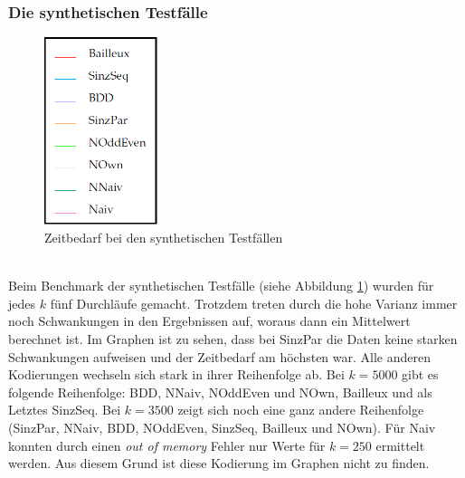 \documentclass[a4,abstract=on]{scrartcl}
\begin{document}
\subsubsection*{Die synthetischen Testfälle}


\begin{figure}[htbp]
\includegraphics[width=3.3cm]{legende.png}
\caption{Zeitbedarf bei den synthetischen Testfällen}
\label{fig:synth}
\end{figure}
\ \\
Beim Benchmark der synthetischen Testfälle (siehe Abbildung \ref{fig:synth}) wurden für jedes $k$ fünf Durchläufe gemacht. Trotzdem treten durch die hohe Varianz immer noch Schwankungen in den Ergebnissen auf, woraus dann ein Mittelwert berechnet ist. Im Graphen ist zu sehen, dass bei SinzPar die Daten keine starken Schwankungen aufweisen und der Zeitbedarf am höchsten war. Alle anderen Kodierungen wechseln sich stark in ihrer Reihenfolge ab. Bei $k=5000$ gibt es folgende Reihenfolge: BDD, NNaiv, NOddEven und NOwn, Bailleux und als Letztes SinzSeq. Bei $k=3500$ zeigt sich noch eine ganz andere Reihenfolge (SinzPar, NNaiv, BDD, NOddEven, SinzSeq, Bailleux und NOwn). Für Naiv konnten durch einen \textit{out of memory} Fehler nur Werte für $k=250$ ermittelt werden. Aus diesem Grund ist diese Kodierung im Graphen nicht zu finden.
\end{document}
